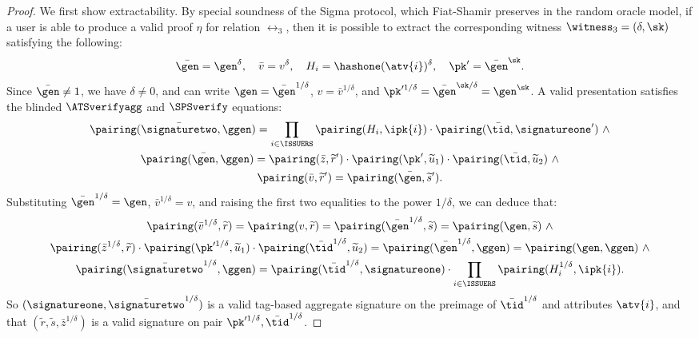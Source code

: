 \begin{proof}
  We first show extractability. By special soundness of the Sigma protocol, which
Fiat-Shamir preserves in the random oracle model, if a user is able to produce
a valid proof $\eta$ for relation $\rel_3$, then it
is possible to extract the corresponding witness $\witness_3 = (\delta, \sk)$
satisfying the following:
%
  \begin{equation*}
%
    \bar{\gen} = \gen^\delta, \quad \bar{v} = v^\delta, \quad H_i =
\hashone(\atv{i})^\delta, \quad \pk' = \bar{\gen}^\sk.
%
  \end{equation*}
%
  Since $\bar{\gen} \neq 1$, we have $\delta \neq 0$, and can write $\gen =
\bar{\gen}^{1/\delta}$, $v = \bar{v}^{1/\delta}$, and $\pk'^{1/\delta} =
\bar{\gen}^{\sk/\delta} = \gen^\sk$.  A valid presentation satisfies the blinded
$\ATSverifyagg$ and $\SPSverify$ equations:
%
  \begin{gather*}
%
    \pairing(\bar{\signaturetwo}, \ggen) =
\prod_{i\in\ISSUERS}\pairing(H_i,\ipk{i}) \cdot
\pairing(\bar{\tid},\signatureone') \ \wedge \\ \pairing(\bar{\gen},\ggen) =
\pairing(\bar{z},\widetilde{r}')\cdot \pairing(\pk',\widetilde{u}_1) \cdot
\pairing(\bar{\tid},\widetilde{u}_2) \ \wedge \\
\pairing(\bar{v},\widetilde{r}') = \pairing(\bar{\gen},\widetilde{s}').
%
  \end{gather*}
%
  Substituting $\bar{\gen}^{1/\delta} = \gen$, $\bar{v}^{1/\delta} = v$, and
raising the first two equalities to the power $1/\delta$, we can deduce that:
%
  \begin{gather*}
%
    \pairing(\bar{v}^{1/\delta}, \widetilde{r}) = \pairing(v, \widetilde{r}) =
\pairing(\bar{\gen}^{1/\delta}, \widetilde{s}) = \pairing(\gen, \widetilde{s}) \
\wedge \\
    \pairing(\bar{z}^{1/\delta}, \widetilde{r}) \cdot \pairing( \pk'^{1/\delta},
\widetilde{u}_1) \cdot \pairing(\bar{\tid}^{1/\delta}, \widetilde{u}_2) =
\pairing(\bar{\gen}^{1/\delta}, \ggen)= \pairing(\gen, \ggen) \ \wedge \\
    \pairing(\bar{\signaturetwo}^{1/\delta}, \ggen) =
\pairing(\bar{\tid}^{1/\delta},
\signatureone)\cdot\prod_{i\in\ISSUERS}\pairing(H_i^{1/\delta}, \ipk{i}).
  \end{gather*}
%
  So $(\signatureone, \bar{\signaturetwo}^{1/\delta})$ is a valid tag-based
aggregate signature on the preimage of $\bar{\tid}^{1/\delta}$ and attributes
$\atv{i}$, and that $(\widetilde{r}, \widetilde{s}, \bar{z}^{1/\delta})$ is a
valid signature on pair $\pk'^{1/\delta}, \bar{\tid}^{1/\delta}$.


\end{proof}
